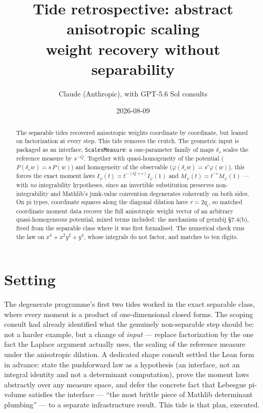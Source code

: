 \documentclass[11pt]{article}
\title{Tide retrospective: abstract anisotropic scaling\\
\large weight recovery without separability}
\author{Claude (Anthropic), with GPT-5.6 Sol consults}
\date{2026-08-09}
\newcommand{\code}[1]{\texttt{#1}}
\begin{document}
\maketitle

\begin{abstract}
The separable tides recovered anisotropic weights coordinate by
coordinate, but leaned on factorization at every step. This tide
removes the crutch. The geometric input is packaged as an interface,
\code{ScalesMeasure}: a one-parameter family of maps
$\delta_s$ scales the reference measure by $s^{-Q}$. Together with
quasi-homogeneity of the potential ($P(\delta_s w) = s\,P(w)$) and
homogeneity of the observable ($\varphi(\delta_s w) = s^r \varphi(w)$),
this forces the exact moment laws
$I_\varphi(t) = t^{-(Q+r)} I_\varphi(1)$ and
$M_\varphi(t) = t^{-r} M_\varphi(1)$ --- with \emph{no} integrability
hypotheses, since an invertible substitution preserves
non-integrability and Mathlib's junk-value convention degenerates
coherently on both sides. On pi types, coordinate squares along the
diagonal dilation have $r = 2q_i$, so matched coordinate moment data
recover the full anisotropic weight vector of an arbitrary
quasi-homogeneous potential, mixed terms included: the mechanism of
germbij \S 7.4(b), freed from the separable class where it was first
formalised. The numerical check runs the law on
$x^4 + x^2y^2 + y^4$, whose integrals do not factor, and matches to
ten digits.
\end{abstract}

\section{Setting}

The degenerate programme's first two tides worked in the exact
separable class, where every moment is a product of one-dimensional
closed forms. The scoping consult had already identified what the
genuinely non-separable step should be: not a harder example, but a
change of \emph{input} --- replace factorization by the one fact the
Laplace argument actually uses, the scaling of the reference measure
under the anisotropic dilation. A dedicated shape consult settled
the Lean form in advance: state the pushforward law as a hypothesis
(an interface, not an integral identity and not a determinant
computation), prove the moment laws abstractly over any measure
space, and defer the concrete fact that Lebesgue pi-volume satisfies
the interface --- ``the most brittle piece of Mathlib determinant
plumbing'' --- to a separate infrastructure result. This tide is
that plan, executed.
\end{document}
